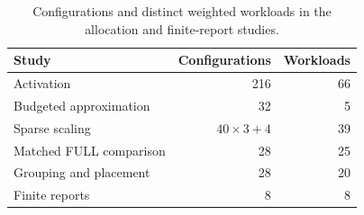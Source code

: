 \begin{table}[t]\centering
\caption{Configurations and distinct weighted workloads in the allocation
and finite-report studies.}
\label{tab:design}
\begin{tabular}{@{}lrr@{}}\toprule
Study&Configurations&Workloads\\\midrule
Activation&216&66\\
Budgeted approximation&32&5\\
Sparse scaling&$40\times3+4$&39\\
Matched FULL comparison&28&25\\
Grouping and placement&28&20\\
Finite reports&8&8\\\bottomrule
\end{tabular}\end{table}
